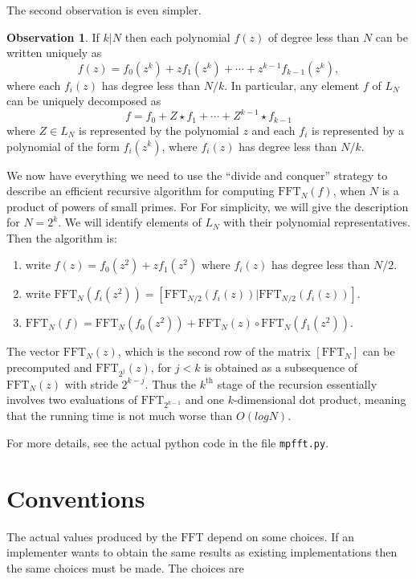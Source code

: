 \documentclass[12pt, letter, oneside]{amsart}
\theoremstyle{definition}
\newtheorem{observation}[para]{Observation}
\theoremstyle{plain}
\numberwithin{equation}{para}
\numberwithin{figure}{section}
\newcommand{\FFT}{\text{FFT}}
\renewcommand{\th}{\text{th}}
\begin{document}
The second observation is even simpler.
\begin{observation}\label{observation:decomposition}
If $k|N$ then each polynomial $f(z)$ of degree less than $N$ can be
written uniquely as
$$f(z) = f_0(z^k)+ zf_1(z^k) + \cdots + z^{k-1}f_{k-1}(z^k),$$
where each $f_i(z)$ has degree less than $N/k$.  In particular, any
element $f$ of $L_N$ can be uniquely decomposed as
$$f = f_0+ Z\star f_1 + \cdots + Z^{k-1}\star f_{k-1}$$
where $Z\in L_N$ is represented by the polynomial $z$ and each $f_i$
is represented by a polynomial of the form $f_i(z^k)$, where $f_i(z)$
has degree less than $N/k$.
\end{observation}

We now have everything we need to use the ``divide and conquer''
strategy to describe an efficient recursive algorithm for computing
$\FFT_N(f)$, when $N$ is a product of powers of small primes.  For For
simplicity, we will give the description for $N = 2^k$. We will
identify elements of $L_N$ with their polynomial representatives.
Then the algorithm is:

\begin{enumerate}
\item write $f(z) = f_0(z^2)+ zf_1(z^2)$ where $f_i(z)$ has degree less than $N/2$.
\item write $\FFT_N(f_i(z^2)) = [\FFT_{N/2}(f_i(z)) | \FFT_{N/2}(f_i(z))]$.
\item $\FFT_N(f) = \FFT_{N}(f_0(z^2)) + \FFT_{N}(z)\circ\FFT_{N}(f_1(z^2))$.
\end{enumerate}

The vector $\FFT_N(z)$, which is the second row of the matrix $[\FFT_N]$ can
be precomputed and $\FFT_{2^j}(z)$, for $j < k$ is obtained as a subsequence
of $\FFT_N(z)$ with stride $2^{k-j}$.  Thus the $k^\th$ stage of the recursion
essentially involves two evaluations of $\FFT_{2^{k-1}}$ and one $k$-dimensional
dot product, meaning that the running time is not much worse than $O(log N)$.

For more details, see the actual python code in the file {\tt mpfft.py}.

\section{Conventions}

The actual values produced by the $\FFT$ depend on some choices.  If an
implementer wants to obtain the same results as existing implementations
then the same choices must be made.  The choices are
\end{document}
